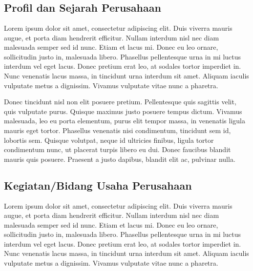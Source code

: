 \chapter{\babDua}

\section{Profil dan Sejarah Perusahaan}
Lorem ipsum dolor sit amet, consectetur adipiscing elit. Duis viverra mauris augue, et porta diam hendrerit efficitur. Nullam interdum nisl nec diam malesuada semper sed id nunc. Etiam et lacus mi. Donec eu leo ornare, sollicitudin justo in, malesuada libero. Phasellus pellentesque urna in mi luctus interdum vel eget lacus. Donec pretium erat leo, at sodales tortor imperdiet in. Nunc venenatis lacus massa, in tincidunt urna interdum sit amet. Aliquam iaculis vulputate metus a dignissim. Vivamus vulputate vitae nunc a pharetra.

Donec tincidunt nisl non elit posuere pretium. Pellentesque quis sagittis velit, quis vulputate purus. Quisque maximus justo posuere tempus dictum. Vivamus malesuada, leo eu porta elementum, purus elit tempor massa, in venenatis ligula mauris eget tortor. Phasellus venenatis nisi condimentum, tincidunt sem id, lobortis sem. Quisque volutpat, neque id ultricies finibus, ligula tortor condimentum nunc, ut placerat turpis libero eu dui. Donec faucibus blandit mauris quis posuere. Praesent a justo dapibus, blandit elit ac, pulvinar nulla. 

\section{Kegiatan/Bidang Usaha Perusahaan}
Lorem ipsum dolor sit amet, consectetur adipiscing elit. Duis viverra mauris augue, et porta diam hendrerit efficitur. Nullam interdum nisl nec diam malesuada semper sed id nunc. Etiam et lacus mi. Donec eu leo ornare, sollicitudin justo in, malesuada libero. Phasellus pellentesque urna in mi luctus interdum vel eget lacus. Donec pretium erat leo, at sodales tortor imperdiet in. Nunc venenatis lacus massa, in tincidunt urna interdum sit amet. Aliquam iaculis vulputate metus a dignissim. Vivamus vulputate vitae nunc a pharetra.

